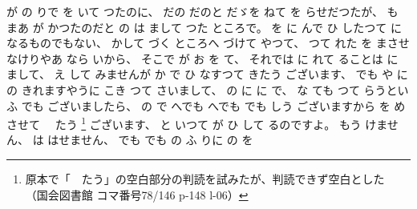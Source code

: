 が
の
りで
%
を
いて
つたのに、
%
だの
だのと
だゞを
ねて
を
らせだつたが、
%
も
まあ
が
かつたのだと
の
は
まして
つた
ところで。
%
を
に
んで
ひ
したつて
になるものでもない、
%
かして
づく
ところへ
づけて
やつて、
%
つて
れた
を
まさせ
なけりやあ
なら
いから、
%
%
そこで
が
お
を
て、
%
それでは
に
れて
ることは
に
まして、
%
え
して
みませんが
か
で
ひ
なすつて
きたう
ございます、
%
でも
や
に
の
きれますやうに
こき
つて
さいまして、
%
の
に
に
で、
%
な
ても
つて
らうといふ
でも
ございましたら、
%
の
で
へでも
へでも
でも
しう
ございますから
を
めさせて
　たう%
\footnote{%
原本で「　たう」の空白部分の判読を試みたが、判読できず空白とした
（国会図書館 コマ番号78/146 p-148 l-06）
}%
ございます、
%
と
いつて
が%
ひ
して
るのですよ。
%
もう
けません、
%
は
はせません、
%
でも
でも
の
ふ
りに
の
を
